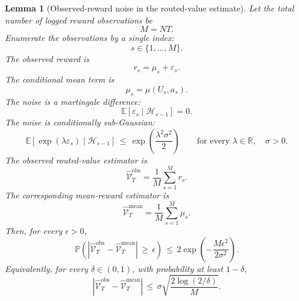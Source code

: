 \documentclass{article} %
\newtheorem{lemma}[theorem]{Lemma}
\begin{document}
\begin{lemma}[Observed-reward noise in the routed-value estimate]
\label{lem:18}
Let the total number of logged reward observations be
\begin{equation}
\label{eq:app-six-noise-M}
M=NT.
\end{equation}
Enumerate the observations by a single index:
\begin{equation}
\label{eq:app-six-noise-index}
s\in\{1,\ldots,M\}.
\end{equation}
The observed reward is
\begin{equation}
\label{eq:app-six-noise-reward}
r_s
=
\mu_s+\varepsilon_s.
\end{equation}
The conditional mean term is
\begin{equation}
\label{eq:app-six-noise-mean}
\mu_s
=
\mu(U_s,a_s).
\end{equation}
The noise is a martingale difference:
\begin{equation}
\label{eq:app-six-noise-mds}
\mathbb{E}[\varepsilon_s\mid \mathcal{H}_{s-1}]
=
0.
\end{equation}
The noise is conditionally sub-Gaussian:
\begin{equation}
\label{eq:app-six-noise-subg}
\mathbb{E}\!\left[
\exp(\lambda\varepsilon_s)
\mid
\mathcal{H}_{s-1}
\right]
\,\le\,
\exp\!\left(\frac{\lambda^2\sigma^2}{2}\right)
\qquad
\text{for every }\lambda\in\mathbb R,
\quad \sigma>0.
\end{equation}
The observed routed-value estimator is
\begin{equation}
\label{eq:app-six-noise-hat-obs}
\widehat{\mathcal{V}}_{T}^{\mathrm{obs}}
=
\frac{1}{M}\sum_{s=1}^{M}r_s.
\end{equation}
The corresponding mean-reward estimator is
\begin{equation}
\label{eq:app-six-noise-hat-mean}
\widehat{\mathcal{V}}_{T}^{\mathrm{mean}}
=
\frac{1}{M}\sum_{s=1}^{M}\mu_s.
\end{equation}
Then, for every \(\epsilon>0\),
\begin{equation}
\label{eq:app-six-noise-tail}
\mathbb{P}\!\left(
\left|
\widehat{\mathcal{V}}_{T}^{\mathrm{obs}}
-
\widehat{\mathcal{V}}_{T}^{\mathrm{mean}}
\right|
\,\ge\,
\epsilon
\right)
\,\le\,
2\exp\!\left(
-\frac{M\epsilon^2}{2\sigma^2}
\right).
\end{equation}
Equivalently, for every \(\delta\in(0,1)\), with probability at least
\(1-\delta\),
\begin{equation}
\label{eq:app-six-noise-radius}
\left|
\widehat{\mathcal{V}}_{T}^{\mathrm{obs}}
-
\widehat{\mathcal{V}}_{T}^{\mathrm{mean}}
\right|
\,\le\,
\sigma\sqrt{\frac{2\log(2/\delta)}{M}}.
\end{equation}
\end{lemma}
\end{document}
